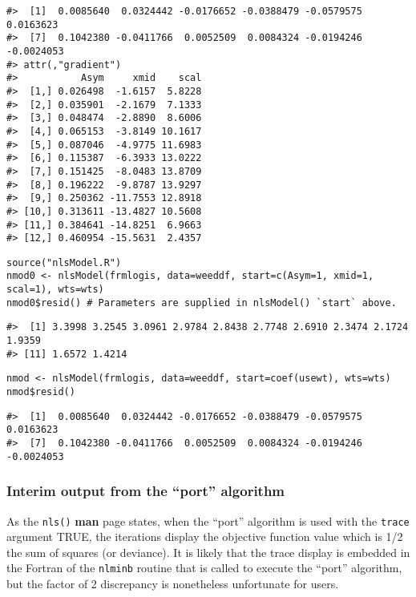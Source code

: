 \begin{verbatim}
#>  [1]  0.0085640  0.0324442 -0.0176652 -0.0388479 -0.0579575  0.0163623
#>  [7]  0.1042380 -0.0411766  0.0052509  0.0084324 -0.0194246 -0.0024053
#> attr(,"gradient")
#>           Asym     xmid    scal
#>  [1,] 0.026498  -1.6157  5.8228
#>  [2,] 0.035901  -2.1679  7.1333
#>  [3,] 0.048474  -2.8890  8.6006
#>  [4,] 0.065153  -3.8149 10.1617
#>  [5,] 0.087046  -4.9775 11.6983
#>  [6,] 0.115387  -6.3933 13.0222
#>  [7,] 0.151425  -8.0483 13.8709
#>  [8,] 0.196222  -9.8787 13.9297
#>  [9,] 0.250362 -11.7553 12.8918
#> [10,] 0.313611 -13.4827 10.5608
#> [11,] 0.384641 -14.8251  6.9663
#> [12,] 0.460954 -15.5631  2.4357
\end{verbatim}

\begin{verbatim}
source("nlsModel.R")
nmod0 <- nlsModel(frmlogis, data=weeddf, start=c(Asym=1, xmid=1, scal=1), wts=wts)
nmod0$resid() # Parameters are supplied in nlsModel() `start` above.
\end{verbatim}

\begin{verbatim}
#>  [1] 3.3998 3.2545 3.0961 2.9784 2.8438 2.7748 2.6910 2.3474 2.1724 1.9359
#> [11] 1.6572 1.4214
\end{verbatim}

\begin{verbatim}
nmod <- nlsModel(frmlogis, data=weeddf, start=coef(usewt), wts=wts)
nmod$resid()
\end{verbatim}

\begin{verbatim}
#>  [1]  0.0085640  0.0324442 -0.0176652 -0.0388479 -0.0579575  0.0163623
#>  [7]  0.1042380 -0.0411766  0.0052509  0.0084324 -0.0194246 -0.0024053
\end{verbatim}

\hypertarget{interim-output-from-the-port-algorithm}{%
\subsubsection{Interim output from the ``port'' algorithm}\label{interim-output-from-the-port-algorithm}}

As the \texttt{nls()} \textbf{man} page states, when the ``port'' algorithm is used with the
\texttt{trace} argument TRUE, the iterations display the objective function value which
is 1/2 the sum of squares (or deviance). It is likely that the trace display is
embedded in the Fortran of the \texttt{nlminb} routine that is called to execute the
``port'' algorithm, but the factor of 2 discrepancy is nonetheless
unfortunate for users.

